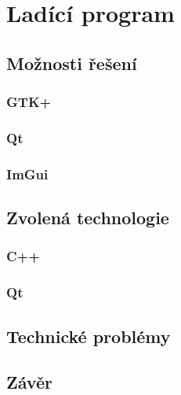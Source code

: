\chapter{Ladící program}

\blind[2]

\section{Možnosti řešení}

\blind[1]

\subsection{GTK+}

\blind[1]

\subsection{Qt}

\blind[2]

\subsection{ImGui}

\blind[3]

\section{Zvolená technologie}

\subsection{C++}

\blind[1]

\subsection{Qt}

\blind[2]


\section{Technické problémy}

\blind[4]

\section{Závěr}

\blind[1]